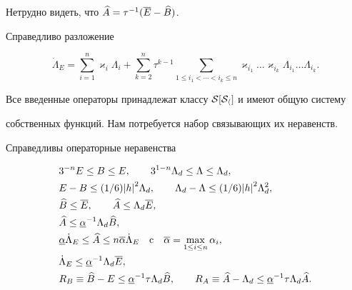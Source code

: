 Нетрудно видеть, что $\widehat A=\tau^{-1}(\overline E-\widehat B)$.


Справедливо разложение 


\begin{equation}


\Dot\Lambda_E=\sum_{i=1}^n\varkappa_i\Lambda_i+\sum_{k=2}^n\tau^{k-1}


\sum_{1\le i_1<\dotsb<i_k\le n}\varkappa_{i_1}\dotsc\varkappa_{i_k}


\Lambda_{i_1}\dotsc\Lambda_{i_k}.


\end{equation}


Все введенные операторы принадлежат  классу $\cal S[S_h]$ и имеют общую систему


собственных функций. Нам потребуется набор связывающих их неравенств.





\begin{lem} Справедливы операторные неравенства


\begin{align}


&3^{-n}E\le B\le E,


\qquad 3^{1-n}\Lambda_d\le\Lambda\le\Lambda_d,\\


%


&E-B\le (1/6){\vert h\vert}^2\Lambda_d,\qquad


\Lambda_d-\Lambda\le(1/6){\vert h\vert}^2\Lambda^2_d,\notag\\


%


&\bbb\le{\overline E},\qquad\aaa\le\Lambda_d {\overline E},\\


%


&\aaa\le{\underline \alpha}^{-1}\Lambda_d\bbb,\\


%


&{\underline \alpha}\Dot\Lambda_E\le\aaa\le n


{\overline \alpha}\Dot\Lambda_E\quad\text{c}\quad\overline\alpha=


\max_{1\le i\le n}\alpha_i,\\


%


&\Dot\Lambda_E\le{\underline \alpha}^{-1}\Lambda_d{\overline E},\\


%


&R_B\equiv\bbb-E\le{\underline \alpha}^{-1}\tau\Lambda_d\bbb,\qquad 


 R_A\equiv\aaa-\Lambda_d\le{\underline \alpha}^{-1}\tau\Lambda_d\aaa.


\end{align}


\end{lem}





